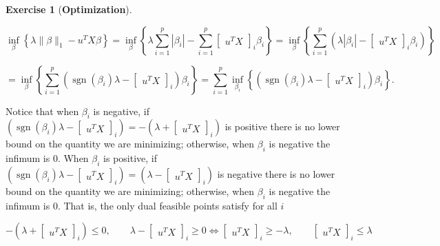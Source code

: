 \documentclass{article}
\theoremstyle{definition}
\newtheorem{exercise}{Exercise}
\theoremstyle{definition}
\theoremstyle{definition}
\theoremstyle{definition}
\theoremstyle{definition}
\begin{document}
\begin{exercise}[\textbf{Optimization}]
\begin{enumerate}[(a)]
\[
 \inf_{\beta} \left\{ \lambda \lVert \beta \rVert_1  - u^T X \beta  \right\} =  \inf_{\beta} \left\{ \lambda \sum_{i=1}^p | \beta_i| - \sum_{i=1}^p \begin{bmatrix} u^T X \end{bmatrix}_i  \beta_i  \right\}  =  \inf_{\beta} \left\{ \sum_{i=1}^p  \left( \lambda  | \beta_i| -  \begin{bmatrix} u^T X \end{bmatrix}_i  \beta_i \right)  \right\} 
 \]
 
 
 \[
 =  \inf_{\beta} \left\{ \sum_{i=1}^p  \left(\operatorname{sgn}(\beta_i) \lambda-  \begin{bmatrix} u^T X \end{bmatrix}_i  \right)    \beta_i  \right\}   =  \sum_{i=1}^p  \inf_{\beta_i} \left\{ \left(\operatorname{sgn}(\beta_i) \lambda-  \begin{bmatrix} u^T X \end{bmatrix}_i  \right)    \beta_i  \right\} .
 \]
 
Notice that when \(\beta_i\) is negative, if \(\left(\operatorname{sgn}(\beta_i) \lambda-  \begin{bmatrix} u^T X \end{bmatrix}_i  \right) =  -\left(\lambda+  \begin{bmatrix} u^T X \end{bmatrix}_i  \right)\) is positive there is no lower bound on the quantity we are minimizing; otherwise, when \(\beta_i\) is negative the infimum is 0. When \(\beta_i\) is positive, if  \(\left(\operatorname{sgn}(\beta_i) \lambda-  \begin{bmatrix} u^T X \end{bmatrix}_i  \right) =  \left(\lambda-  \begin{bmatrix} u^T X \end{bmatrix}_i  \right)\) is negative there is no lower bound on the quantity we are minimizing; otherwise, when \(\beta_i\) is negative the infimum is 0. That is, the only dual feasible points satisfy for all \(i\)

\[
  -\left(\lambda+  \begin{bmatrix} u^T X \end{bmatrix}_i  \right) \leq 0, \qquad \lambda-  \begin{bmatrix} u^T X \end{bmatrix}_i   \geq 0 \iff \begin{bmatrix} u^TX\end{bmatrix}_i \geq -\lambda, \qquad \begin{bmatrix} u^TX\end{bmatrix}_i \leq \lambda
\]


\end{enumerate}
\end{exercise}
\end{document}
